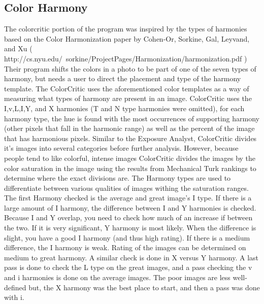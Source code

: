 \documentclass[twocolumn]{article}
\begin{document}
\subsection{Color Harmony}   
The colorcritic portion of the program was inspired by the types of harmonies based on the Color
Harmonization paper by Cohen-Or, Sorkine, Gal, Leyvand, and Xu ( http://cs.nyu.edu/~sorkine/ProjectPages/Harmonization/harmonization.pdf )
Their program shifts the colors in a photo to be part of one of the seven types of harmony, but needs a user to direct the placement and type of the harmony template. The ColorCritic uses the aforementioned color templates as a way of measuring what types of harmony are present in an image.
ColorCritic uses the I,v,L,I,Y, and X harmonies (T and N type harmonies were omitted), for each harmony type, the hue is found with the most occurrences of supporting harmony (other pixels that fall in the harmonic range) as well as the percent of the image that has harmonious pixels. Similar to the Exposure Analyst, ColorCritic divides it's images into several categories before further analysis. However, because people tend to like colorful, intense images ColorCritic divides the images by the color saturation in the image using the results from Mechanical Turk rankings to determine where the exact divisions are.
The Harmony types are used to differentiate between various qualities of images withing the saturation ranges.
The first Harmony checked is the average and great image's I type. If there is a large amount of I harmony, the difference between I and Y harmonies is checked. Because I and Y overlap, you need to check how much of an increase if between the two. If it is very significant, Y harmony is most likely. When the difference is slight, you have a good I harmony (and thus high rating). If there is a medium difference, the I harmony is weak. Rating of the images can be determined on medium to great harmony. A similar check is done in X versus Y harmony. A last pass is done to check the L type on the great images, and a pass checking the v and i harmonies is done on the average images.
The poor images are less well-defined but, the X harmony was the best place to start, and then a pass was done with i.
\end{document}
